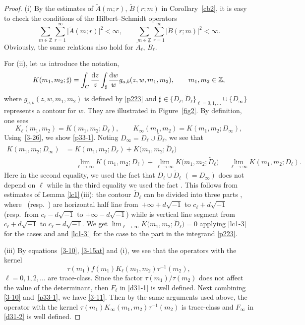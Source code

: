 \documentclass[pdftex]{sigma}
\numberwithin{equation}{section}
\def\i{\infty}
\def\t{\tau}
\def\Z{\mathbb{Z}}
\begin{document}
\begin{proof}
 (i) By the estimates of $\tilde{A}(m;r)$, $\tilde{B}(r;m)$ in Corollary~\ref{cb2},
 it is easy to check
 the conditions of the Hilbert--Schmidt operators
\[
 \sum_{m\in\Z}\sum_{r=1}^{\i}\big|\tilde{A}(m;r)\big|^2<\i,
 \qquad
 \sum_{m\in\Z}\sum_{r=1}^{\i}\big|\tilde{B}(r;m)\big|^2<\i.
\]
Obviously, the same relations also hold for $\tilde{A}_{\ell}$, $\tilde{B}_{\ell}$.

 For (ii), let us introduce the notation,
\begin{align}
\label{3-26}
 K(m_1,m_2;\sharp)=
 \int_C\frac{{\rm d}z}{z}
 \int_{\sharp}\frac{{\rm d}w}{w}
 g_{a,b}(z,w,m_1,m_2), \qquad m_1,m_2\in\Z,
\end{align}
 where $g_{a,b}(z,w,m_1,m_2)$ is defined by \eqref{p223} and $\sharp\in\big\{D_{\ell}, \tilde{D}_{\ell}\big\}_{\ell=0,1,\dots}\cup\{D_{\i}\}$ represents a contour for $w$. They are illustrated in Figure~\ref{fig2}. By definition, one sees
\[%
 K_\ell(m_1,m_2)=K(m_1,m_2;D_\ell),\qquad
 K_{\i}(m_1,m_2)= K(m_1,m_2;D_\i),
\]
Using~\eqref{3-26}, we show \eqref{p33-1}.
 Noting $D_{\i}=D_\ell\cup\tilde{D}_\ell$, we see that
\begin{align*}%
 K(m_1,m_2;D_{\i})
 &=
 K(m_1,m_2;D_\ell)+ K\big(m_1,m_2;\tilde{D}_\ell\big)
 \\
 &=
 \lim_{\ell\rightarrow\i}K(m_1,m_2;D_\ell)
 +
 \lim_{\ell\rightarrow\i}K\big(m_1,m_2;\tilde{D}_\ell\big)
 =\lim_{\ell\rightarrow\i}K(m_1,m_2;D_\ell).
\end{align*}
 Here in the second equality, we used the
 fact that $D_\ell\cup\tilde{D}_\ell$ $(=D_{\i})$
 does not depend on $\ell$ while in the third equality we used the
 fact \smash{$\lim_{\ell\rightarrow\i}K\big(m_1,m_2;\tilde{D}_\ell\big)=0$}. This follows from estimates of Lemma \ref{lc1}\,(iii): the contour $\tilde{D}_\ell$ can be divided into three
 parts , where~ \big(resp.\ \big) are horizontal half line from~${+\infty+ d\sqrt{-1}}$ to $c_{\ell}+d\sqrt{-1}$ (resp.\ from $c_{\ell}-d\sqrt{-1}$ to $+\infty-d\sqrt{-1}$) while  is vertical line segment from $c_{\ell}+d\sqrt{-1}$ to $c_{\ell}-d\sqrt{-1}$. We get $\lim_{\ell\rightarrow\i}K\big(m_1,m_2;\tilde{D}_\ell\big)=0$ applying \eqref{lc1-3} for the cases  and  and \eqref{lc1-3'} for the case  to the part  in the integrand \eqref{p223}.

(iii)
 By equations~\eqref{3-10}, \eqref{3-15at} and (i), we see that the operators with the kernel
 \[\t(m_1)f(m_1) K_\ell(m_1,m_2)\t^{-1}(m_2),\]
 $\ell=0,1,2,\dots$ are trace-class. Since the factor $\t(m_1)/\t(m_2)$ does not affect the value of the determinant, then $F_\ell$ in \eqref{d31-1} is well defined.
 Next combining \eqref{3-10} and~\eqref{p33-1}, we have \eqref{3-11}. Then by the same arguments used above, the operator with the kernel $\t(m_1)K_\i (m_1,m_2)\t^{-1}(m_2)$ is trace-class and $F_\infty$ in \eqref{d31-2} is well defined.
\end{proof}
\end{document}
